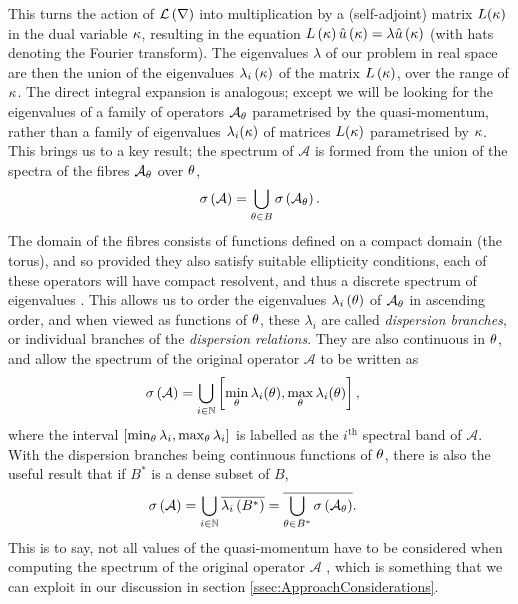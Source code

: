 This turns the action of $\mathcal{L}\left( \nabla \right)$ into multiplication by a (self-adjoint) matrix $L(\kappa)$ in the dual variable $\kappa$, resulting in the equation $L\left( \kappa \right)\hat{u}\left( \kappa \right)=\lambda\hat{u}\left( \kappa \right)$ (with hats denoting the Fourier transform).
The eigenvalues $\lambda$ of our problem in real space are then the union of the eigenvalues $\lambda_i\left( \kappa \right)$ of the matrix $L\left( \kappa \right)$, over the range of $\kappa$.
The direct integral expansion is analogous; except we will be looking for the eigenvalues of a family of operators $\mathcal{A}_{\theta}$ parametrised by the quasi-momentum, rather than a family of eigenvalues $\lambda_i(\kappa)$ of matrices $L(\kappa)$ parametrised by $\kappa$. 
This brings us to a key result; the spectrum of $\mathcal{A}$ is formed from the union of the spectra of the fibres $\mathcal{A}_{\theta}$ over $\theta$,
\begin{align*}
	\sigma\left( \mathcal{A} \right) = \bigcup_{\theta\in B}\sigma\left( \mathcal{A}_{\theta} \right).
\end{align*}
The domain of the fibres consists of functions defined on a compact domain (the torus), and so provided they also satisfy suitable ellipticity conditions, each of these operators will have compact resolvent, and thus a discrete spectrum of eigenvalues \cite[section 7.3]{kuchment2001mathematics}.
This allows us to order the eigenvalues $\lambda_i\left( \theta \right)$ of $\mathcal{A}_{\theta}$ in ascending order, and when viewed as functions of $\theta$, these $\lambda_i$ are called \emph{dispersion branches}, or individual branches of the \emph{dispersion relations}.
They are also continuous in $\theta$, and allow the spectrum of the original operator $\mathcal{A}$ to be written as
\begin{align*}
	\sigma\left( \mathcal{A} \right) &= \bigcup_{i\in\mathbb{N}}\left[  \min_{\theta}\lambda_i(\theta), \max_{\theta}\lambda_i(\theta)  \right],
\end{align*}
where the interval $\left[  \min_{\theta}\lambda_i, \max_{\theta}\lambda_i  \right]$ is labelled as the $i^{\text{th}}$ spectral band of $\mathcal{A}$.
With the dispersion branches being continuous functions of $\theta$, there is also the useful result that if $B^*$ is a dense subset of $B$,
\begin{align} \label{eq:TP-DenseQMSubsetSuffices}
	\sigma\left( \mathcal{A} \right) &= \bigcup_{i\in\mathbb{N}}\overline{\lambda_i\left( B^* \right)}
	= \overline{\bigcup_{\theta\in B^*}\sigma\left( \mathcal{A}_{\theta} \right)}.
\end{align}
This is to say, not all values of the quasi-momentum have to be considered when computing the spectrum of the original operator $\mathcal{A}$ \cite[section 7.4]{kuchment2001mathematics}, which is something that we can exploit in our discussion in section \ref{ssec:ApproachConsiderations}.

